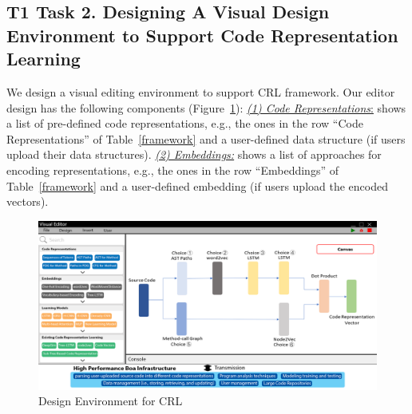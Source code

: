 


	


\subsection{T1 Task 2. Designing A Visual Design Environment to Support Code Representation Learning}

We design a visual editing environment to support CRL framework.
Our editor design has the following components (Figure~\ref{editor}): \underline{{\em (1) Code
    Representations}:} shows a list of pre-defined code
representations, e.g., the ones in the row ``Code Representations'' of
Table~\ref{framework} and a user-defined data structure (if users
upload their data structures).  \underline{\textit{(2) Embeddings:}}
shows a list of approaches for encoding representations, e.g., the
ones in the row ``Embeddings'' of Table~\ref{framework} and a
user-defined embedding (if users upload the encoded vectors).

 \begin{figure}
	\centering
	\vspace{-10pt}
	\includegraphics[scale=0.16]{graphs/editor.png}
	\vspace{-15pt}
	\caption{Design Environment for CRL}
	\label{editor}
	\vspace{-10pt}
\end{figure}

